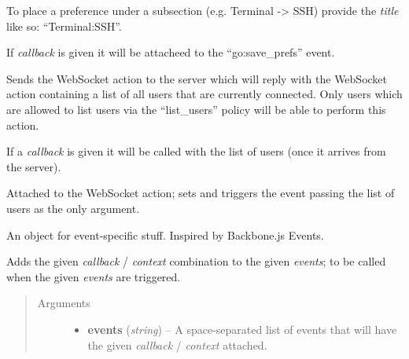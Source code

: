 \documentclass[letterpaper,10pt,openany]{sphinxmanual}
\begin{document}
\begin{fulllineitems}
\begin{fulllineitems}
\begin{fulllineitems}
To place a preference under a subsection (e.g. Terminal -\textgreater{} SSH) provide the \emph{title} like so:  ``Terminal:SSH''.

If \emph{callback} is given it will be attacheed to the ``go:save\_prefs'' event.

\end{fulllineitems}



\begin{fulllineitems}
\label{Developer/js_gateone:GateOne.User.listUsers}
Sends the  WebSocket action to the server which will reply with the  WebSocket action containing a list of all users that are currently connected.  Only users which are allowed to list users via the ``list\_users'' policy will be able to perform this action.

If a \emph{callback} is given it will be called with the list of users (once it arrives from the server).

\end{fulllineitems}



\begin{fulllineitems}
\label{Developer/js_gateone:GateOne.User.userListAction}
Attached to the  WebSocket action; sets  and triggers the  event passing the list of users as the only argument.

\end{fulllineitems}


\end{fulllineitems}



\begin{fulllineitems}
\label{Developer/js_gateone:GateOne.Events}
An object for event-specific stuff.  Inspired by Backbone.js Events.


\begin{fulllineitems}
\label{Developer/js_gateone:GateOne.Events.on}
Adds the given \emph{callback} / \emph{context} combination to the given \emph{events}; to be called when the given \emph{events} are triggered.
\begin{quote}\begin{description}
\item[{Arguments}] \leavevmode\begin{itemize}
\item {} 
\textbf{events} (\emph{string}) -- A space-separated list of events that will have the given \emph{callback} / \emph{context} attached.


\end{itemize}
\end{description}
\end{quote}
\end{fulllineitems}
\end{fulllineitems}
\end{fulllineitems}
\end{document}
